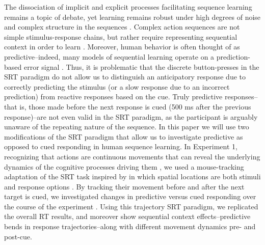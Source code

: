 \documentclass[man,floatsintext]{apa6}
\begin{document}
The dissociation of implicit and explicit processes facilitating sequence learning remains a topic of debate, yet learning remains robust under high degrees of noise and complex structure in the sequences \cite{Cleeremans:1991}. Complex action sequences are not simple stimulus-response chains, but rather require representing sequential context in order to learn \cite{Lashley:1951}. Moreover, human behavior is often thought of as predictive--indeed, many models of sequential learning operate on a prediction-based error signal \cite{Botvinick:2004,KachergisPT:2014}. Thus, it is problematic that the discrete button-presses in the SRT paradigm do not allow us to distinguish an anticipatory response due to correctly predicting the stimulus (or a slow response due to an incorrect prediction) from reactive responses based on the cue. Truly predictive responses--that is, those made before the next response is cued (500 ms after the previous response)--are not even valid in the SRT paradigm, as the participant is arguably unaware of the repeating nature of the sequence. In this paper we will use two modifications of the SRT paradigm that allow us to investigate predictive as opposed to cued responding in human sequence learning. In Experiment 1, recognizing that actions are continuous movements that can reveal the underlying dynamics of the cognitive processes driving them \cite{Spivey:2006}, we used a mouse-tracking adaptation of the SRT task inspired by  in which spatial locations are both stimuli and response options \cite{Kachergis:2014b,Kachergis:2014a}. By tracking their movement before and after the next target is cued, we investigated changes in predictive versus cued responding over the course of the experiment \cite{Tubau:2007}. Using this trajectory SRT paradigm, we replicated the overall  RT results, and moreover show sequential context effects--predictive bends in response trajectories--along with different movement dynamics pre- and post-cue.
\end{document}
